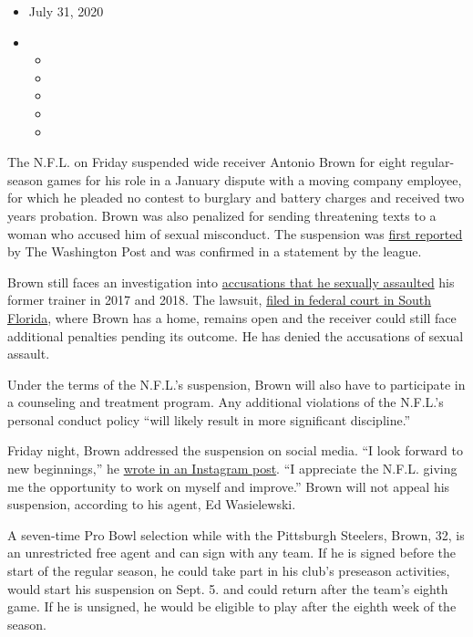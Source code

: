 \begin{itemize}
\item
  July 31, 2020
\item
  \begin{itemize}
  \item
  \item
  \item
  \item
  \item
  \end{itemize}
\end{itemize}

The N.F.L. on Friday suspended wide receiver Antonio Brown for eight
regular-season games for his role in a January dispute with a moving
company employee, for which he pleaded no contest to burglary and
battery charges and received two years probation. Brown was also
penalized for sending threatening texts to a woman who accused him of
sexual misconduct. The suspension was
\href{https://twitter.com/RobertKlemko/status/1289272211207929856}{first
reported} by The Washington Post and was confirmed in a statement by the
league.

Brown still faces an investigation into
\href{https://www.nytimes.com/2019/09/10/sports/football/antonio-brown-sexual-asssault-patriots.html}{accusations
that he sexually assaulted} his former trainer in 2017 and 2018. The
lawsuit,
\href{https://www.nytimes.com/2019/09/10/sports/football/antonio-brown-sexual-asssault-patriots.html}{filed
in federal court in South Florida}, where Brown has a home, remains open
and the receiver could still face additional penalties pending its
outcome. He has denied the accusations of sexual assault.

Under the terms of the N.F.L.'s suspension, Brown will also have to
participate in a counseling and treatment program. Any additional
violations of the N.F.L.'s personal conduct policy ``will likely result
in more significant discipline.''

Friday night, Brown addressed the suspension on social media. ``I look
forward to new beginnings,'' he
\href{https://www.instagram.com/p/CDVCrkeBb1w/}{wrote in an Instagram
post}. ``I appreciate the N.F.L. giving me the opportunity to work on
myself and improve.'' Brown will not appeal his suspension, according to
his agent, Ed Wasielewski.

A seven-time Pro Bowl selection while with the Pittsburgh Steelers,
Brown, 32, is an unrestricted free agent and can sign with any team. If
he is signed before the start of the regular season, he could take part
in his club's preseason activities, would start his suspension on Sept.
5. and could return after the team's eighth game. If he is unsigned, he
would be eligible to play after the eighth week of the season.

